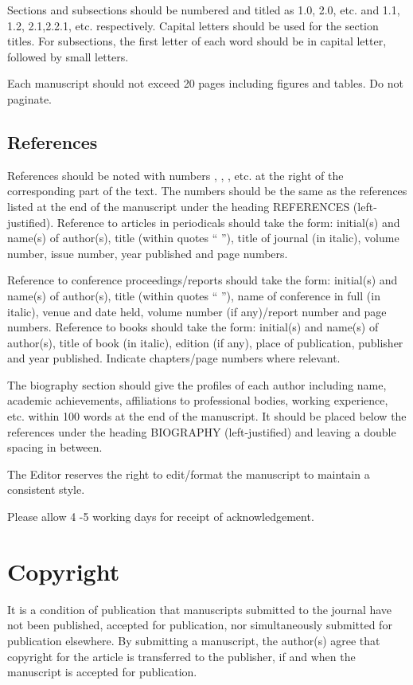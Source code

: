 \documentclass[10pt,a4paper]{mjcs}
\begin{document}
Sections and subsections should be numbered and titled as 1.0, 2.0, etc. and 1.1, 1.2, 2.1,2.2.1, etc. respectively. Capital letters should be used for the section titles. For subsections, the first letter of each word should be in capital letter, followed by small letters.

Each manuscript should not exceed 20 pages including figures and tables. Do not paginate.

\subsection{References}
References should be noted with numbers \cite{01}, \cite{02}, \cite{03}, etc. at the right of the corresponding part of the text. The numbers should be the same as the references listed at the end of the manuscript under the heading REFERENCES (left-justified). Reference to articles in periodicals should take the form: initial(s) and name(s) of author(s), title (within quotes “ ”), title of journal (in italic), volume number, issue number, year published and page numbers.

Reference to conference proceedings/reports should take the form: initial(s) and name(s) of author(s), title (within quotes “ ”), name of conference in full (in italic), venue and date held, volume number (if any)/report number and page numbers. Reference to books should take the form: initial(s) and name(s) of author(s), title of book (in italic), edition (if any), place of publication, publisher and year published. Indicate chapters/page numbers where relevant.

The biography section should give the profiles of each author including name, academic achievements, affiliations to professional bodies, working experience, etc. within 100 words at the end of the manuscript. It should be placed below the references under the heading BIOGRAPHY (left-justified) and leaving a double spacing in between.

The Editor reserves the right to edit/format the manuscript to maintain a consistent style.

Please allow 4 -5 working days for receipt of acknowledgement.

\section*{Copyright}
It is a condition of publication that manuscripts submitted to the journal have not been published, accepted for publication, nor simultaneously submitted for publication elsewhere. By submitting a manuscript, the author(s) agree that copyright for the article is transferred to the publisher, if and when the manuscript is accepted for publication.
\end{document}

